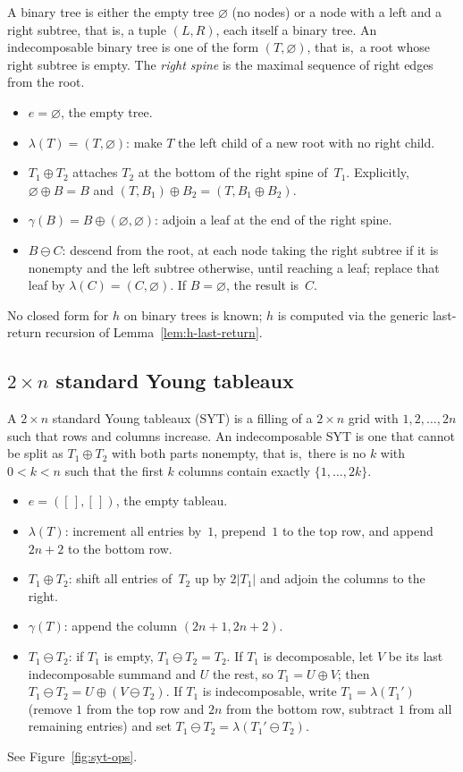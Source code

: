 \documentclass[a4paper,11pt]{article}
\theoremstyle{definition}
\begin{document}
A binary tree is either the empty tree $\varnothing$
(no nodes) or a node with a left and a right subtree, that is, a tuple $(L,R)$,
each itself a binary tree. An indecomposable binary tree is one of the
form $(T, \varnothing)$, that is,\ a root whose
right subtree is empty. The \emph{right spine} is the
maximal sequence of right edges from the root.
\begin{itemize}
\item $e = \varnothing$, the empty tree.
\item $\lambda(T) = (T, \varnothing)$: make $T$ the left
  child of a new root with no right child.
\item $T_1 \oplus T_2$ attaches $T_2$ at the bottom of
  the right spine of~$T_1$. Explicitly,
  $\varnothing \oplus B = B$ and
  $(T, B_1) \oplus B_2 = (T, B_1 \oplus B_2)$.
\item $\gamma(B) = B \oplus (\varnothing, \varnothing)$:
  adjoin a leaf at the end of the right spine.
\item $B \ominus C$: descend from the root, at each node
  taking the right subtree if it is nonempty and the
  left subtree otherwise, until reaching a leaf; replace
  that leaf by $\lambda(C) = (C, \varnothing)$. If
  $B = \varnothing$, the result is~$C$.
\end{itemize}

No closed form for $h$ on binary trees is known; $h$ is
computed via the generic last-return recursion of
Lemma~\ref{lem:h-last-return}.

\subsection{$2 \times n$ standard Young tableaux}\label{sec:syt}

A $2 \times n$ standard Young tableaux (SYT) is a filling of a $2 \times n$ grid
with $1, 2, \ldots, 2n$ such that rows and columns
increase. An indecomposable SYT is one that cannot be split
as $T_1 \oplus T_2$ with both parts nonempty, that is,\ there
is no $k$ with $0 < k < n$ such that the first $k$ columns
contain exactly $\{1, \ldots, 2k\}$.
\begin{itemize}
\item $e = ([\,], [\,])$, the empty tableau.
\item $\lambda(T)$: increment all entries by~$1$,
  prepend~$1$ to the top row, and append $2n{+}2$ to
  the bottom row.
\item $T_1 \oplus T_2$: shift all entries of~$T_2$ up
  by $2|T_1|$ and adjoin the columns to the right.
\item $\gamma(T)$: append the column
  $(2n{+}1, 2n{+}2)$.
\item $T_1 \ominus T_2$: if $T_1$ is empty, $T_1 \ominus T_2 = T_2$.
  If $T_1$ is decomposable, let $V$
  be its last indecomposable summand and $U$ the rest, so
  $T_1 = U \oplus V$; then
  $T_1 \ominus T_2 = U \oplus (V \ominus T_2)$. If $T_1$
  is indecomposable, write $T_1 = \lambda(T_1')$ (remove
  $1$ from the top row and $2n$ from the bottom row,
  subtract $1$ from all remaining entries) and set
  $T_1 \ominus T_2 = \lambda(T_1' \ominus T_2)$.
\end{itemize}
See Figure~\ref{fig:syt-ops}.
\end{document}
